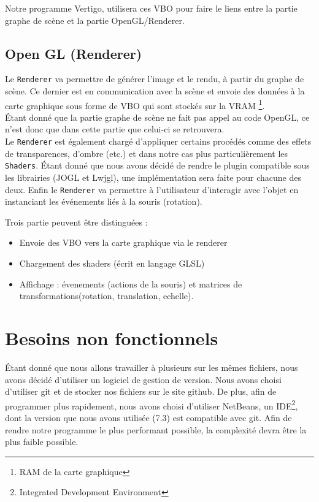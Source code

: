 \documentclass[11pt]{report}
\begin{document}
 Notre programme Vertigo, utilisera ces VBO pour faire le liens entre la partie graphe de scène et la partie OpenGL/Renderer.
 
 


\subsection{Open GL (Renderer)}

Le \texttt{Renderer} va permettre de générer l'image et le rendu, à partir du graphe de scène. Ce dernier est en communication avec la scène et envoie des données à la carte graphique sous forme de VBO qui sont stockés sur la VRAM \footnote{RAM de la carte graphique}. \\
Étant donné que la partie graphe de scène ne fait pas appel au code OpenGL, ce n'est donc que dans cette partie que celui-ci se retrouvera. \\
Le \texttt{Renderer} est également chargé d'appliquer certains procédés comme des effets de transparences, d'ombre (etc.) et dans notre cas plus particulièrement les \texttt{Shaders}.
Étant donné que nous avons décidé de rendre le plugin compatible sous les librairies (JOGL et Lwjgl), une implémentation sera faite pour chacune des deux.
Enfin le \texttt{Renderer} va permettre à l'utilisateur d'interagir avec l'objet en instanciant les événements liés à la souris (rotation).

Trois partie peuvent être distinguées :
\begin{itemize}
\item Envoie des VBO vers la carte graphique via le renderer
\item Chargement des shaders (écrit en langage GLSL)
\item Affichage : évenements (actions de la souris) et matrices de transformations(rotation, translation, echelle).
\end{itemize}


\section{Besoins non fonctionnels}
Étant donné que nous allons travailler à plusieurs sur les mêmes fichiers, nous avons décidé d'utiliser un logiciel de gestion de version. Nous avons choisi d'utiliser git\cite{git} et de stocker nos fichiers sur le site github\cite{github}.
De plus, afin de programmer plus rapidement, nous avons choisi d'utiliser NetBeans\cite{netbeans}, un IDE\footnote{Integrated Development Environment}, dont la version que nous avons utilisée (7.3) est compatible avec git.
Afin de rendre notre programme le plus performant possible, la complexité devra être la plus faible possible. 
\end{document}
